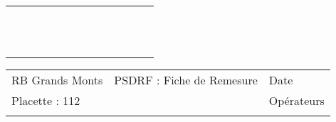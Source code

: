 \documentclass[a4paper, landscape]{article}\usepackage[]{graphicx}\usepackage[]{color}
\begin{document}
{\begin{tabular}{|p{1cm}|p{2cm}|p{1.6cm}|p{1.6cm}|p{1.6cm}|p{1.6cm}|p{1.5cm}|p{1.5cm}|p{1.5cm}|p{1.5cm}|p{1.5cm}|p{7.5cm}|p{5cm}|}
 &  &  &  &  &  &  &  &  &  &  &  &  \\ 
   \rowcolor[gray]{0.95} \hline
 &  &  &  &  &  &  &  &  &  &  &  &  \\ 
   \hline
 &  &  &  &  &  &  &  &  &  &  &  &  \\ 
   \rowcolor[gray]{0.95} \hline
 &  &  &  &  &  &  &  &  &  &  &  &  \\ 
   \hline
 &  &  &  &  &  &  &  &  &  &  &  &  \\ 
   \rowcolor[gray]{0.95} \hline
 &  &  &  &  &  &  &  &  &  &  &  &  \\ 
   \hline
 &  &  &  &  &  &  &  &  &  &  &  &  \\ 
   \rowcolor[gray]{0.95} \hline
 &  &  &  &  &  &  &  &  &  &  &  &  \\ 
   \hline
 &  &  &  &  &  &  &  &  &  &  &  &  \\ 
   \rowcolor[gray]{0.95} \hline
 &  &  &  &  &  &  &  &  &  &  &  &  \\ 
   \hline
 &  &  &  &  &  &  &  &  &  &  &  &  \\ 
   \rowcolor[gray]{0.95} \hline
 &  &  &  &  &  &  &  &  &  &  &  &  \\ 
   \hline
\end{tabular}
}

\begin{tabular}{p{10cm}p{10cm}p{8cm}}
  RB Grands Monts & PSDRF : Fiche de Remesure & Date \\ 
  Placette : 112 &  & Opérateurs \\ 
   &  &  \\ 
  \end{tabular}
\end{document}
